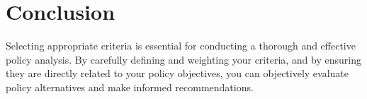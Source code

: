 \documentclass{article}
\theoremstyle{definition}
\theoremstyle{plain}
\begin{document}
\section{Conclusion}

Selecting appropriate criteria is essential for conducting a thorough and effective policy analysis. By carefully defining and weighting your criteria, and by ensuring they are directly related to your policy objectives, you can objectively evaluate policy alternatives and make informed recommendations.












\end{document}
